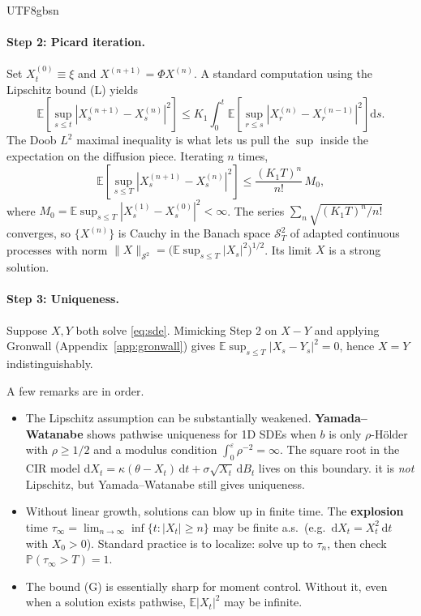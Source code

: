 \documentclass{article}
\begin{document}
\begin{CJK*}{UTF8}{gbsn}
\paragraph{Step 2: Picard iteration.} Set $X^{(0)}_t\equiv\xi$ and $X^{(n+1)}=\Phi X^{(n)}$. A standard computation using the Lipschitz bound (L) yields
\[
  \mathbb{E}\!\left[\sup_{s\le t}|X^{(n+1)}_s-X^{(n)}_s|^2\right]\le K_1\!\int_0^t\mathbb{E}\!\left[\sup_{r\le s}|X^{(n)}_r-X^{(n-1)}_r|^2\right]\mathrm{d}s.
\]
The Doob $L^2$ maximal inequality is what lets us pull the $\sup$ inside the expectation on the diffusion piece. Iterating $n$ times,
\[
  \mathbb{E}\!\left[\sup_{s\le T}|X^{(n+1)}_s-X^{(n)}_s|^2\right]\le \frac{(K_1 T)^n}{n!}\,M_0,
\]
where $M_0=\mathbb{E}\sup_{s\le T}|X^{(1)}_s-X^{(0)}_s|^2<\infty$. The series $\sum_n \sqrt{(K_1T)^n/n!}$ converges, so $\{X^{(n)}\}$ is Cauchy in the Banach space $\mathcal{S}^2_T$ of adapted continuous processes with norm $\|X\|_{\mathcal{S}^2}=\bigl(\mathbb{E}\sup_{s\le T}|X_s|^2\bigr)^{1/2}$. Its limit $X$ is a strong solution.

\paragraph{Step 3: Uniqueness.} Suppose $X,Y$ both solve \eqref{eq:sde}. Mimicking Step 2 on $X-Y$ and applying Gronwall (Appendix~\ref{app:gronwall}) gives $\mathbb{E}\sup_{s\le T}|X_s-Y_s|^2=0$, hence $X=Y$ indistinguishably.

\medskip

A few remarks are in order.

\begin{itemize}
    \item The Lipschitz assumption can be substantially weakened. \textbf{Yamada--Watanabe} shows pathwise uniqueness for 1D SDEs when $b$ is only $\rho$-H\"older with $\rho\ge 1/2$ and a modulus condition $\int_0^\varepsilon \rho^{-2}=\infty$. The square root in the CIR model $\mathrm{d}X_t=\kappa(\theta-X_t)\,\mathrm{d}t+\sigma\sqrt{X_t}\,\mathrm{d}B_t$ lives on this boundary. it is \emph{not} Lipschitz, but Yamada--Watanabe still gives uniqueness.
    \item Without linear growth, solutions can blow up in finite time. The \textbf{explosion} time
    $\tau_\infty=\lim_{n\to\infty}\inf\{t:|X_t|\ge n\}$
    may be finite a.s.\ (e.g.\ $\mathrm{d}X_t=X_t^2\,\mathrm{d}t$ with $X_0>0$). Standard practice is to localize: solve up to $\tau_n$, then check $\mathbb{P}(\tau_\infty>T)=1$.
    \item The bound (G) is essentially sharp for moment control. Without it, even when a solution exists pathwise, $\mathbb{E}|X_t|^2$ may be infinite.
\end{itemize}


\end{CJK*}
\end{document}
